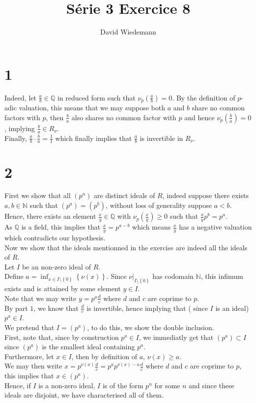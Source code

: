 \documentclass[11pt, a4paper]{article}
\begin{document}
\title{Série 3 Exercice 8}
\author{David Wiedemann}
\maketitle
\section*{1}
Indeed, let $\frac{a}{b}\in \mathbb{Q}$ in reduced form such that $\nu_p(\frac{a}{b} )=0 $. By the definition of $p$-adic valuation, this means that we may suppose both $a$ and $b$ share no common factors with $p$, then $\frac{b}{a}$ also shares no common factor with $p$ and hence $\nu_p( \frac{b}{a}) =0$, implying $ \frac{b}{a}\in R_\nu$.\\
Finally, $\frac{a}{b}\cdot \frac{b}{a}= \frac{1}{1}$ which finally implies that $\frac{a}{b}$ is invertible in $R_\nu$.
\section*{2}
First we show that all $( p^{n}) $ are distinct ideals of $ R$, indeed suppose there exists $a,b \in \mathbb{N}$ such that $ ( p^{a}) = ( p^{b} )$, without loss of generality suppose $a<b$.\\
Hence, there exists an element $ \frac{x}{y} \in \mathbb{Q}$ with $ \nu_p( \frac{x}{y} ) \geq 0$ such that $ \frac{x}{y}p^{b} = p^{a} $.\\
As $ \mathbb{Q}$ is a field, this implies that $ \frac{x}{y}= p^{a-b}$ which means $ \frac{x}{y}$ has a negative valuation which contradicts our hypothesis.\\

Now we show that the ideals mentionned in the exercise are indeed all the ideals of $ R$.\\
Let $I$ be an non-zero ideal of $ R$.\\
Define $ a = \inf_{x \in I\setminus \left\{ 0 \right\} 	} \left\{ \nu( x)  \right\} $. Since $\nu\vert_{I \setminus \left\{ 0 \right\} }  $ has codomain $ \mathbb{N}$, this infimum exists and is attained by some element $y \in I$.\\
Note that we may write $ y = p^{a} \frac{d}{c}$ where $d$ and $c$ are coprime to $p$.\\
By part $1$, we know that $\frac{d}{c}$ is invertible, hence implying that ( since $I$ is an ideal) $p^{a}\in I$.\\

We pretend that $ I = ( p^{a}) $, to do this, we show the double inclusion.\\
First, note that, since by construction $ p^{a}\in I$, we immediatly get that $ ( p^{a}) \subset I$ since $( p^{a}) $ is the smallest ideal containing $ p^{a}$.\\
Furthermore, let $x \in I$, then by definition of $a$, $\nu( x) \geq a$.\\
We may then write $x = p^{\nu( x) }\frac{d}{c} = p^{a} p^{\nu( x) -a}\frac{d}{c}$ where $d$ and $c$ are coprime to $p$, this implies that $x\in ( p^{a}) $.\\
Hence, if $I$ is a  non-zero ideal, $I$ is of the form $p^{n}$ for some $n$ and since these ideals are disjoint, we have characterised all of them.
\end{document}
